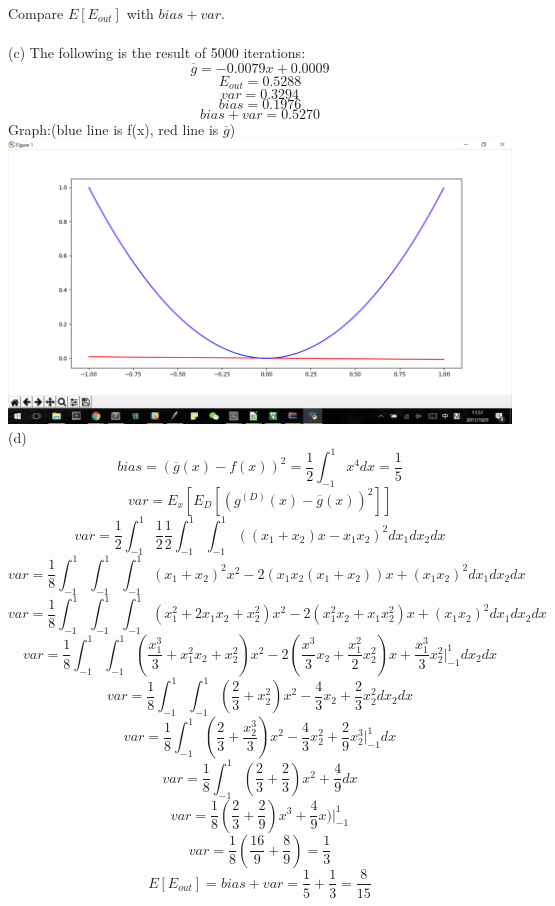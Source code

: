\documentclass[12pt]{article}
\begin{document}
Compare $E[E_{out}]$ with $bias+var$.\\\\
(c)
The following is the result of 5000 iterations:
$$\overline{g} = -0.0079x+0.0009$$
$$E_{out}=0.5288$$
$$var=0.3294$$
$$bias=0.1976$$
$$bias+var=0.5270$$
Graph:(blue line is f(x), red line is $\overline{g}$)\\
\includegraphics[scale=0.6]{graph}\\
(d)
$$bias = (\overline{g}(x)-f(x))^2=\frac{1}{2}\int_{-1}^{1}x^4dx=\frac{1}{5}$$
$$var = E_x[E_D[(g^{(D)}(x)-\overline{g}(x))^2]]$$
$$var = \frac{1}{2}\int_{-1}^1 \frac{1}{2} \frac{1}{2}\int_{-1}^1\int_{-1}^1 ((x_1+x_2)x-x_1x_2)^2 dx_1dx_2dx$$
$$var = \frac{1}{8}\int_{-1}^1\int_{-1}^1\int_{-1}^1 (x_1+x_2)^2x^2-2(x_1x_2(x_1+x_2))x+(x_1x_2)^2 dx_1dx_2dx$$
$$var = \frac{1}{8}\int_{-1}^1\int_{-1}^1\int_{-1}^1 (x_1^2+2x_1x_2+x_2^2)x^2-2(x_1^2x_2+x_1x_2^2)x+(x_1x_2)^2 dx_1dx_2dx$$
$$var = \frac{1}{8}\int_{-1}^1\int_{-1}^1 (\frac{x_1^3}{3}+x_1^2x_2+x_2^2)x^2-2(\frac{x^3}{3}x_2+\frac{x_1^2}{2}x_2^2)x+\frac{x_1^3}{3}x_2^2 \big|^1_{-1}dx_2dx$$
$$var = \frac{1}{8}\int_{-1}^1\int_{-1}^1 (\frac{2}{3}+x_2^2)x^2-\frac{4}{3}x_2+\frac{2}{3}x_2^2 dx_2dx$$
$$var = \frac{1}{8}\int_{-1}^1 (\frac{2}{3}+\frac{x_2^3}{3})x^2-\frac{4}{3}x_2^2+\frac{2}{9}x_2^3 \big|^1_{-1}dx$$
$$var = \frac{1}{8}\int_{-1}^1 (\frac{2}{3}+\frac{2}{3})x^2+\frac{4}{9}dx$$
$$var = \frac{1}{8}(\frac{2}{3}+\frac{2}{9})x^3+\frac{4}{9}x) \big|^1_{-1}$$
$$var = \frac{1}{8}(\frac{16}{9}+\frac{8}{9})=\frac{1}{3}$$
$$E[E_{out}]=bias+var=\frac{1}{5}+\frac{1}{3}=\frac{8}{15}$$
\end{document}
